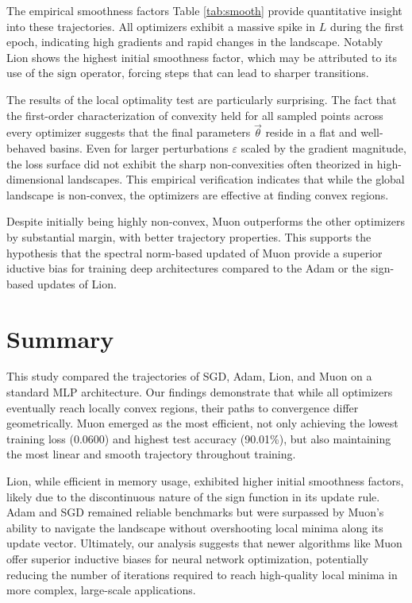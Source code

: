 \documentclass[10pt,conference,compsocconf]{IEEEtran}
\begin{document}
The empirical smoothness factors Table \ref{tab:smooth} provide quantitative insight into these
trajectories. All optimizers exhibit a massive spike in $L$ during the first epoch, indicating high
gradients and rapid changes in the landscape.
Notably Lion shows the highest initial smoothness factor, which may be attributed to its use of the
$\mathrm{sign}$ operator, forcing steps that can lead to sharper transitions.

The results of the local optimality test are particularly surprising.
The fact that the first-order characterization of convexity held for all sampled points across every
optimizer suggests that the final parameters $\vec{\theta}$ reside in a flat and well-behaved basins.
Even for larger perturbations $\varepsilon$ scaled by the gradient magnitude, the loss surface did
not exhibit the sharp non-convexities often theorized in high-dimensional landscapes.
This empirical verification indicates that while the global landscape is non-convex, the optimizers
are effective at finding convex regions.

Despite initially being highly non-convex, Muon outperforms the other optimizers by substantial
margin, with better trajectory properties.
This supports the hypothesis that the spectral norm-based updated of Muon provide a superior
iductive bias for training deep architectures compared to the Adam or the sign-based updates of Lion.


\section{Summary}
This study compared the trajectories of SGD, Adam, Lion, and Muon on a standard MLP architecture.
Our findings demonstrate that while all optimizers eventually reach locally convex regions, their
paths to convergence differ geometrically.
Muon emerged as the most efficient, not only achieving the lowest training loss (0.0600) and highest
test accuracy (90.01\%), but also maintaining the most linear and smooth trajectory throughout
training.

Lion, while efficient in memory usage, exhibited higher initial smoothness factors, likely due to
the discontinuous nature of the sign function in its update rule. Adam and SGD remained reliable
benchmarks but were surpassed by Muon's ability to navigate the landscape without overshooting local
minima along its update vector. Ultimately, our analysis suggests that newer algorithms like Muon
offer superior inductive biases for neural network optimization, potentially reducing the number of
iterations required to reach high-quality local minima in more complex, large-scale applications.

\newpage
\printbibliography
\end{document}
